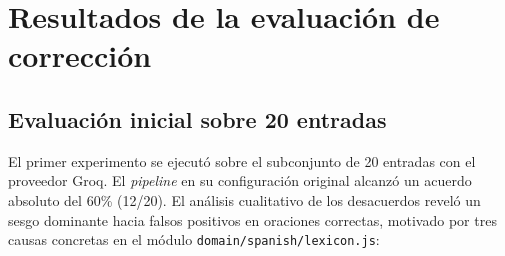 \section{Resultados de la evaluación de corrección}

\subsection{Evaluación inicial sobre 20 entradas}

El primer experimento se ejecutó sobre el subconjunto de 20 entradas con el
proveedor Groq. El \textit{pipeline} en su configuración original alcanzó un
acuerdo absoluto del 60\% (12/20). El análisis cualitativo de los desacuerdos
reveló un sesgo dominante hacia falsos positivos en oraciones correctas,
motivado por tres causas concretas en el módulo
\texttt{domain/spanish/lexicon.js}:

